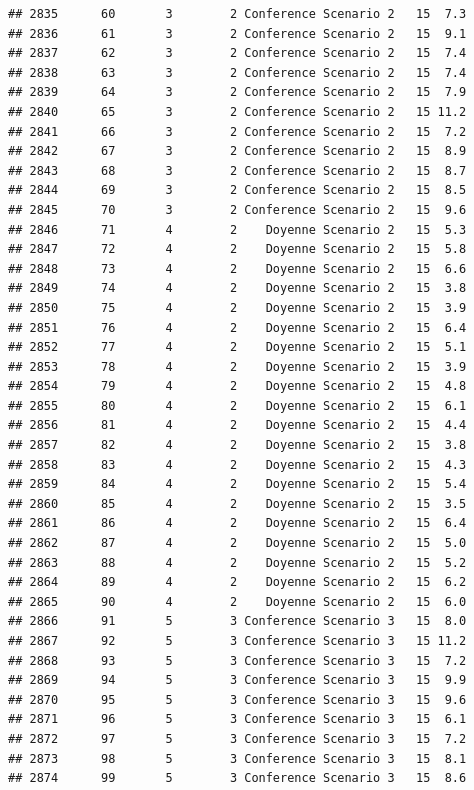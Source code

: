 \documentclass[
]{article}
\begin{document}
\begin{verbatim}
## 2835      60       3        2 Conference Scenario 2   15  7.3
## 2836      61       3        2 Conference Scenario 2   15  9.1
## 2837      62       3        2 Conference Scenario 2   15  7.4
## 2838      63       3        2 Conference Scenario 2   15  7.4
## 2839      64       3        2 Conference Scenario 2   15  7.9
## 2840      65       3        2 Conference Scenario 2   15 11.2
## 2841      66       3        2 Conference Scenario 2   15  7.2
## 2842      67       3        2 Conference Scenario 2   15  8.9
## 2843      68       3        2 Conference Scenario 2   15  8.7
## 2844      69       3        2 Conference Scenario 2   15  8.5
## 2845      70       3        2 Conference Scenario 2   15  9.6
## 2846      71       4        2    Doyenne Scenario 2   15  5.3
## 2847      72       4        2    Doyenne Scenario 2   15  5.8
## 2848      73       4        2    Doyenne Scenario 2   15  6.6
## 2849      74       4        2    Doyenne Scenario 2   15  3.8
## 2850      75       4        2    Doyenne Scenario 2   15  3.9
## 2851      76       4        2    Doyenne Scenario 2   15  6.4
## 2852      77       4        2    Doyenne Scenario 2   15  5.1
## 2853      78       4        2    Doyenne Scenario 2   15  3.9
## 2854      79       4        2    Doyenne Scenario 2   15  4.8
## 2855      80       4        2    Doyenne Scenario 2   15  6.1
## 2856      81       4        2    Doyenne Scenario 2   15  4.4
## 2857      82       4        2    Doyenne Scenario 2   15  3.8
## 2858      83       4        2    Doyenne Scenario 2   15  4.3
## 2859      84       4        2    Doyenne Scenario 2   15  5.4
## 2860      85       4        2    Doyenne Scenario 2   15  3.5
## 2861      86       4        2    Doyenne Scenario 2   15  6.4
## 2862      87       4        2    Doyenne Scenario 2   15  5.0
## 2863      88       4        2    Doyenne Scenario 2   15  5.2
## 2864      89       4        2    Doyenne Scenario 2   15  6.2
## 2865      90       4        2    Doyenne Scenario 2   15  6.0
## 2866      91       5        3 Conference Scenario 3   15  8.0
## 2867      92       5        3 Conference Scenario 3   15 11.2
## 2868      93       5        3 Conference Scenario 3   15  7.2
## 2869      94       5        3 Conference Scenario 3   15  9.9
## 2870      95       5        3 Conference Scenario 3   15  9.6
## 2871      96       5        3 Conference Scenario 3   15  6.1
## 2872      97       5        3 Conference Scenario 3   15  7.2
## 2873      98       5        3 Conference Scenario 3   15  8.1
## 2874      99       5        3 Conference Scenario 3   15  8.6

\end{verbatim}
\end{document}
